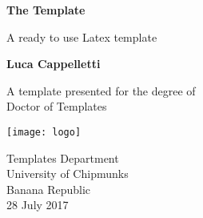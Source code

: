 \begin{titlepage}
    \begin{center}
        \vspace*{1em}
        
        \textbf{\large{The Template}}
        
        \vspace{1em}
        A ready to use Latex template
        
        \vspace{1em}
        
        \textbf{Luca Cappelletti}
        
        \vfill
        
        A template presented for the degree of\\
        Doctor of Templates
        
         \vspace{1em}
        
        \texttt{[image: logo]}
        
         \vspace{1em}

        Templates Department\\
        University of Chipmunks\\
        Banana Republic\\
        28 July 2017
        
    \end{center}
\end{titlepage}